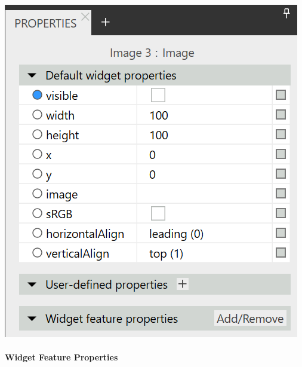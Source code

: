 \begin{center}
  \includegraphics[scale=0.8]{figures/TemplateProperties_Adaption.png}
  \label{fig:TemplateProperties_Adaption}
\end{center}


\paragraph{Widget Feature Properties}


